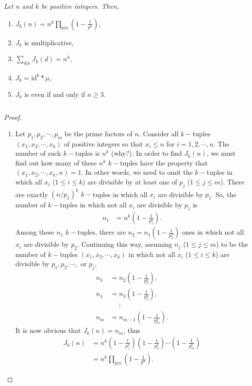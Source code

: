 \documentclass[12pt]{subfile}
\begin{document}
	
		\begin{theorem} \slshape
			Let $n$ and $k$ be positive integers. Then,
				\begin{enumerate}
					\item $\displaystyle J_k(n) = n^k \prod\limits_{p|n} \left(1 - \frac{1}{p^k}\right)$,					
					\item $J_k$ is multiplicative,
					\item $\displaystyle \sum_{d|n} J_k(d) = n^k$,
					\item $J_k = \text{id}^k \ast \mu$,
					\item $J_k$ is even if and only if $n \geq 3$.
				\end{enumerate}
		\end{theorem}
$ $

		\begin{proof}
			$ $
			\begin{enumerate}
				\item Let $p_1,p_2,\cdots,p_m$ be the prime factors of $n$. Consider all $k-$tuples $(x_1,x_2,\cdots,x_k)$ of positive integers so that $x_i\leq n$ for $i=1,2,\cdots,n$. The number of such $k-$tuples is $n^k$ (why?). In order to find $J_k(n)$, we must find out how many of these $n^k$ $k-$tuples have the property that $(x_1,x_2,\cdots,x_k,n)=1$. In other words, we need to omit the $k-$tuples in which all $x_i$ ($1 \leq i \leq k$) are divisible by at least one of $p_j$ ($1 \leq j \leq m$). There are exactly $(n/p_1)^k$ $k-$tuples in which all $x_i$ are divisible by $p_1$. So, the number of $k-$tuples in which not all $x_i$ are divisible by $p_1$ is
					\begin{align*}
						n_1 &= n^k \left(1 - \frac{1}{p_1^k}\right).
					\end{align*}
				Among these $n_1$ $k-$tuples, there are $n_2 = n_1\left(1 - \frac{1}{p_2^k}\right)$ ones in which not all $x_i$ are divisible by $p_2$. Continuing this way, assuming $n_j$ ($1 \leq j \leq m$) to be the number of $k-$tuples $(x_1,x_2,\cdots,x_k)$ in which not all $x_i$ ($1 \leq i \leq k$) are divisible by $p_1, p_2, \cdots, $ or $p_j$,
					\begin{align*}
						n_3 &= n_2 \left(1 - \frac{1}{p_3^k}\right),\\
						n_4 &= n_3 \left(1 - \frac{1}{p_4^k}\right),\\
						&\phantom{=}\vdots\\
						n_m &= n_{m-1} \left(1 - \frac{1}{p_m^k}\right).
					\end{align*}
				It is now obvious that $J_k(n)=n_m$, thus
					\begin{align*}
						J_k(n) &= n^k \left(1 - \frac{1}{p_1^k}\right) \left(1 - \frac{1}{p_2^k}\right)\cdots \left(1 - \frac{1}{p_m^k}\right)\\
							   &= n^k \prod\limits_{p|n} \left(1 - \frac{1}{p^k}\right).
					\end{align*}
				

\end{enumerate}
\end{proof}
\end{document}
